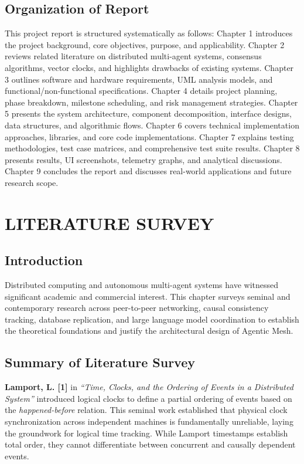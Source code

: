 \documentclass[12pt,a4paper]{report}
\begin{document}
\section{Organization of Report}
This project report is structured systematically as follows:
Chapter 1 introduces the project background, core objectives, purpose, and applicability.
Chapter 2 reviews related literature on distributed multi-agent systems, consensus algorithms, vector clocks, and highlights drawbacks of existing systems.
Chapter 3 outlines software and hardware requirements, UML analysis models, and functional/non-functional specifications.
Chapter 4 details project planning, phase breakdown, milestone scheduling, and risk management strategies.
Chapter 5 presents the system architecture, component decomposition, interface designs, data structures, and algorithmic flows.
Chapter 6 covers technical implementation approaches, libraries, and core code implementations.
Chapter 7 explains testing methodologies, test case matrices, and comprehensive test suite results.
Chapter 8 presents results, UI screenshots, telemetry graphs, and analytical discussions.
Chapter 9 concludes the report and discusses real-world applications and future research scope.

\chapter{LITERATURE SURVEY}

\section{Introduction}
Distributed computing and autonomous multi-agent systems have witnessed significant academic and commercial interest. This chapter surveys seminal and contemporary research across peer-to-peer networking, causal consistency tracking, database replication, and large language model coordination to establish the theoretical foundations and justify the architectural design of Agentic Mesh.

\section{Summary of Literature Survey}

\noindent
\textbf{Lamport, L. [1]} in \textit{“Time, Clocks, and the Ordering of Events in a Distributed System”} introduced logical clocks to define a partial ordering of events based on the \textit{happened-before} relation. This seminal work established that physical clock synchronization across independent machines is fundamentally unreliable, laying the groundwork for logical time tracking. While Lamport timestamps establish total order, they cannot differentiate between concurrent and causally dependent events.
\end{document}
